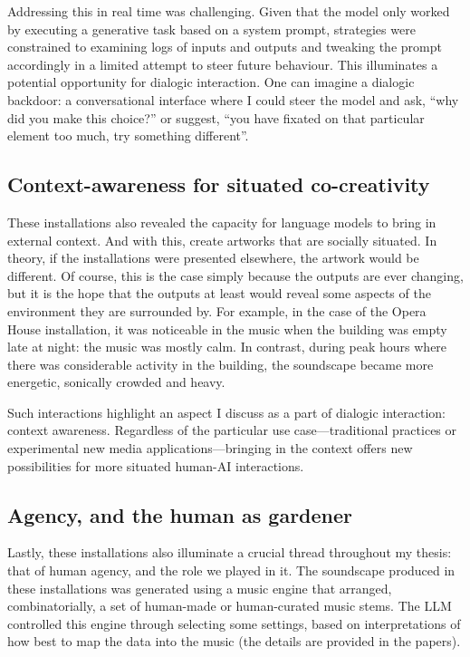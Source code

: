 Addressing this in real time was challenging. Given that the model only worked by executing a generative task based on a system prompt, strategies were constrained to examining logs of inputs and outputs and tweaking the prompt accordingly in a limited attempt to steer future behaviour. This illuminates a potential opportunity for dialogic interaction. One can imagine a dialogic backdoor: a conversational interface where I could steer the model and ask, “why did you make this choice?” or suggest, “you have fixated on that particular element too much, try something different”.

\subsection{Context-awareness for situated co-creativity}


These installations also revealed the capacity for language models to bring in external context. And with this, create artworks that are socially situated. In theory, if the installations were presented elsewhere, the artwork would be different. Of course, this is the case simply because the outputs are ever changing, but it is the hope that the outputs at least would reveal some aspects of the environment they are surrounded by. For example, in the case of the Opera House installation, it was noticeable in the music when the building was empty late at night: the music was mostly calm. In contrast, during peak hours where there was considerable activity in the building, the soundscape became more energetic, sonically crowded and heavy.

Such interactions highlight an aspect I discuss as a part of dialogic interaction: context awareness. Regardless of the particular use case—traditional practices or experimental new media applications—bringing in the context offers new possibilities for more situated human-AI interactions.

\subsection{Agency, and the human as gardener}

Lastly, these installations also illuminate a crucial thread throughout my thesis: that of human agency, and the role we played in it. The soundscape produced in these installations was generated using a music engine that arranged, combinatorially, a set of human-made or human-curated music stems. The LLM controlled this engine through selecting some settings, based on interpretations of how best to map the data into the music (the details are provided in the papers).

